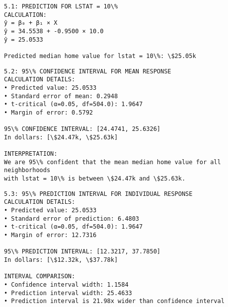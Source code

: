 \documentclass[8pt, twocolumn]{extarticle}
\begin{document}
    \begin{Verbatim}[commandchars=\\\{\}]
5.1: PREDICTION FOR LSTAT = 10\%
CALCULATION:
ŷ = β₀ + β₁ × X
ŷ = 34.5538 + -0.9500 × 10.0
ŷ = 25.0533

Predicted median home value for lstat = 10\%: \$25.05k

    \end{Verbatim}

    \begin{Verbatim}[commandchars=\\\{\}]
5.2: 95\% CONFIDENCE INTERVAL FOR MEAN RESPONSE
CALCULATION DETAILS:
• Predicted value: 25.0533
• Standard error of mean: 0.2948
• t-critical (α=0.05, df=504.0): 1.9647
• Margin of error: 0.5792

95\% CONFIDENCE INTERVAL: [24.4741, 25.6326]
In dollars: [\$24.47k, \$25.63k]

INTERPRETATION:
We are 95\% confident that the mean median home value for all neighborhoods
with lstat = 10\% is between \$24.47k and \$25.63k.

    \end{Verbatim}

    \begin{Verbatim}[commandchars=\\\{\}]
5.3: 95\% PREDICTION INTERVAL FOR INDIVIDUAL RESPONSE
CALCULATION DETAILS:
• Predicted value: 25.0533
• Standard error of prediction: 6.4803
• t-critical (α=0.05, df=504.0): 1.9647
• Margin of error: 12.7316

95\% PREDICTION INTERVAL: [12.3217, 37.7850]
In dollars: [\$12.32k, \$37.78k]

INTERVAL COMPARISON:
• Confidence interval width: 1.1584
• Prediction interval width: 25.4633
• Prediction interval is 21.98x wider than confidence interval

    \end{Verbatim}
\end{document}
